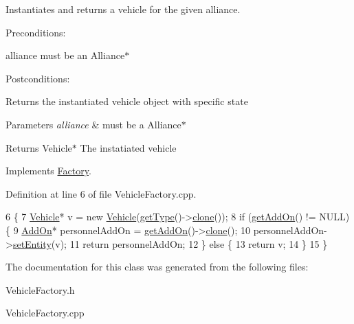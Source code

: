 Instantiates and returns a vehicle for the given alliance. 

Preconditions\+:
\begin{DoxyItemize}
\item alliance must be an Alliance$\ast$
\end{DoxyItemize}

Postconditions\+:
\begin{DoxyItemize}
\item Returns the instantiated vehicle object with specific state
\end{DoxyItemize}


\begin{DoxyParams}{Parameters}
{\em alliance} & must be a Alliance$\ast$ \\
\hline
\end{DoxyParams}
\begin{DoxyReturn}{Returns}
Vehicle$\ast$ The instatiated vehicle 
\end{DoxyReturn}


Implements \hyperlink{classFactory}{Factory}.



Definition at line 6 of file Vehicle\+Factory.\+cpp.


\begin{DoxyCode}
6                                                        \{
7     \hyperlink{classVehicle}{Vehicle}* v = \textcolor{keyword}{new} \hyperlink{classVehicle}{Vehicle}(\hyperlink{classFactory_ac91051006ace7ec5bb6ecf0fe6d02d58}{getType}()->\hyperlink{classVehicleFactory_a6d874e37b573b491a49e303209ac42cd}{clone}());
8     \textcolor{keywordflow}{if} (\hyperlink{classFactory_a994153930f59cafb280e91d5b100b5aa}{getAddOn}() != NULL) \{
9         \hyperlink{classAddOn}{AddOn}* personnelAddOn = \hyperlink{classFactory_a994153930f59cafb280e91d5b100b5aa}{getAddOn}()->\hyperlink{classAddOn_a5a090bf8b4e7260aa35d6f5b9d151955}{clone}();
10         personnelAddOn->\hyperlink{classAddOn_ac9f4263e3558015fdad46adefceed197}{setEntity}(v);
11         \textcolor{keywordflow}{return} personnelAddOn;
12     \} \textcolor{keywordflow}{else} \{
13         \textcolor{keywordflow}{return} v;
14     \}
15 \}
\end{DoxyCode}


The documentation for this class was generated from the following files\+:\begin{DoxyCompactItemize}
\item 
Vehicle\+Factory.\+h\item 
Vehicle\+Factory.\+cpp\end{DoxyCompactItemize}
